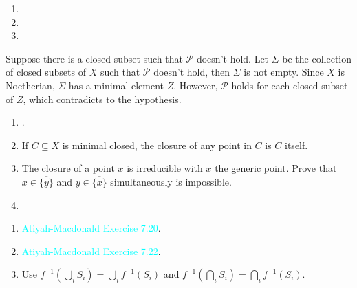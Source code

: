 \begin{exercise}\label{ex3.15}
	\begin{enumerate}[label=(\alph*),ref=\theexercise(\alph*)]
		\item 
		\item 
		\item 
	\end{enumerate}
\end{exercise}

\begin{exercise}\label{ex3.16}
	Suppose there is a closed subset such that $\mathcal{P}$ doesn't hold. Let $\Sigma$ be the collection of closed subsets of $X$ such that $\mathcal{P}$ doesn't hold, then $\Sigma$ is not empty. Since $X$ is Noetherian, $\Sigma$ has a minimal element $Z$. However, $\mathcal{P}$ holds for each closed subset of $Z$, which contradicts to the hypothesis.
\end{exercise}

\begin{exercise}\label{ex3.17}
	\begin{enumerate}[label=(\alph*),ref=\theexercise(\alph*)]
		\item {}.
		\item If $C\subseteq X$ is minimal closed, the closure of any point in $C$ is $C$ itself.
		\item The closure of a point $x$ is irreducible with $x$ the generic point. Prove that $x\in\overline{\{y\}}$ and $y\in\overline{\{x\}}$ simultaneously is impossible.
		\addtocounter{enumi}{2}
		\item 
	\end{enumerate}
\end{exercise}

\begin{exercise}\label{ex3.18}
	\begin{enumerate}[label=(\alph*),ref=\theexercise(\alph*)]
		\item[(a),(b)] \textcolor{cyan}{Atiyah-Macdonald Exercise 7.20}.
		\addtocounter{enumi}{2}
		\item \textcolor{cyan}{Atiyah-Macdonald Exercise 7.22}.
		\item Use $f^{-1}\!\left(\bigcup_iS_i\right)=\bigcup_if^{-1}\!\left(S_i\right)$ and $f^{-1}\!\left(\bigcap_iS_i\right)=\bigcap_if^{-1}\!\left(S_i\right)$.
	\end{enumerate}
\end{exercise}

